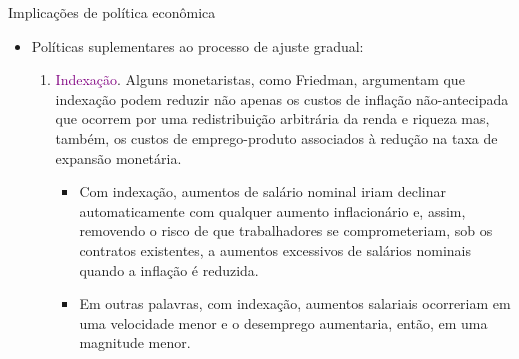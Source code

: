 \documentclass[10pt]{beamer}
\begin{document}
\begin{frame}{Implicações de política econômica}
    \begin{itemize}
        \item Políticas suplementares ao processo de ajuste gradual:
        \bigskip
        \begin{enumerate}
            \item \textcolor{purple}{Indexação}. Alguns monetaristas, como Friedman, argumentam que indexação podem reduzir não apenas os custos de inflação não-antecipada que ocorrem por uma redistribuição arbitrária da renda e riqueza mas, também, os custos de emprego-produto associados à redução na taxa de expansão monetária.
            \bigskip
            \begin{itemize}
                \item Com indexação, aumentos de salário nominal iriam declinar automaticamente com qualquer aumento inflacionário e, assim, removendo o risco de que trabalhadores se comprometeriam, sob os contratos existentes, a aumentos excessivos de salários nominais quando a inflação é reduzida.
                \bigskip
                \item Em outras palavras, com indexação, aumentos salariais ocorreriam em uma velocidade menor e o desemprego aumentaria, então, em uma magnitude menor.
            \end{itemize}
        \end{enumerate}
    \end{itemize}    
\end{frame}
\end{document}
